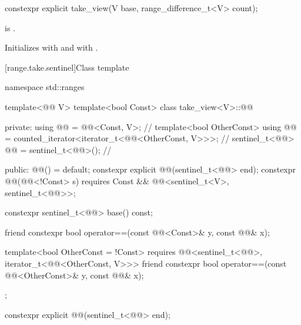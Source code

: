 %
\begin{itemdecl}
constexpr explicit take_view(V base, range_difference_t<V> count);
\end{itemdecl}

\begin{itemdescr}
\pnum
\expects
{} is .

\pnum
\effects
Initializes  with  and
 with .
\end{itemdescr}

[range.take.sentinel]{Class template }

%
\begin{codeblock}
namespace std::ranges {
  template<@@ V>
  template<bool Const>
  class take_view<V>::@@ {
  private:
    using @@ = @@<Const, V>;                                     // \expos
    template<bool OtherConst>
      using @@ = counted_iterator<iterator_t<@@<OtherConst, V>>>;  // \expos
    sentinel_t<@@> @@ = sentinel_t<@@>();                             // \expos

  public:
    @@() = default;
    constexpr explicit @@(sentinel_t<@@> end);
    constexpr @@(@@<!Const> s)
      requires Const && @@<sentinel_t<V>, sentinel_t<@@>>;

    constexpr sentinel_t<@@> base() const;

    friend constexpr bool operator==(const @@<Const>& y, const @@& x);

    template<bool OtherConst = !Const>
      requires @@<sentinel_t<@@>, iterator_t<@@<OtherConst, V>>>
    friend constexpr bool operator==(const @@<OtherConst>& y, const @@& x);
  };
}
\end{codeblock}

%
\begin{itemdecl}
constexpr explicit @@(sentinel_t<@@> end);
\end{itemdecl}

